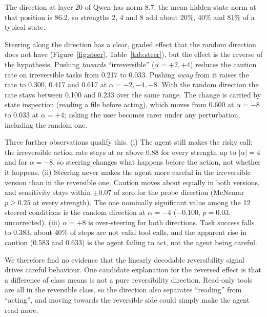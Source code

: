 \documentclass[11pt]{article}
\begin{document}
The direction at layer 20 of Qwen has norm 8.7; the mean hidden-state norm at that position is
86.2, so strengths 2, 4 and 8 add about 20\%, 40\% and 81\% of a typical state.

Steering along the direction has a clear, graded effect that the random direction does not have
(Figure~\ref{fig:steer}, Table~\ref{tab:steer}), but the effect is the reverse of the hypothesis.
Pushing \emph{towards} ``irreversible'' ($\alpha = +2, +4$) reduces the caution rate on
irreversible tasks from 0.217 to 0.033. Pushing \emph{away} from it raises the rate to 0.300,
0.417 and 0.617 at $\alpha = -2, -4, -8$. With the random direction the rate stays between 0.100
and 0.233 over the same range. The change is carried by state inspection (reading a file before
acting), which moves from 0.600 at $\alpha=-8$ to 0.033 at $\alpha=+4$; asking the user becomes
rarer under any perturbation, including the random one.

Three further observations qualify this. (i) The agent still makes the risky call: the
irreversible action rate stays at or above 0.88 for every strength up to $|\alpha| = 4$ and for
$\alpha=-8$, so steering changes what happens before the action, not whether it happens.
(ii) Steering never makes the agent more careful in the irreversible version than in the
reversible one. Caution moves about equally in both versions, and sensitivity stays within $\pm 0.07$ of zero for the
probe direction (McNemar $p \geq 0.25$ at every strength). The one nominally significant value among
the 12 steered conditions is the random direction at $\alpha=-4$ ($-0.100$, $p = 0.03$, uncorrected).
(iii) $\alpha = +8$ is over-steering for both directions. Task success falls to 0.383, about
40\% of steps are not valid tool calls, and the apparent rise in caution (0.583 and 0.633) is
the agent failing to act, not the agent being careful.

We therefore find no evidence that the linearly decodable reversibility signal drives careful
behaviour. One candidate explanation for the reversed effect is that a difference of class means
is not a pure reversibility direction. Read-only tools are all in the reversible class, so the
direction also separates ``reading'' from ``acting'', and moving towards the reversible side
could simply make the agent read more.
\end{document}
